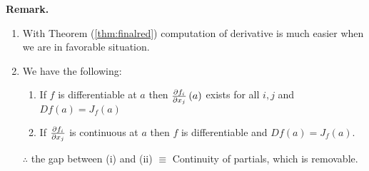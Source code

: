 \documentclass[Analysis-3]{subfiles}
\begin{document}
\textbf{Remark.}
\begin{enumerate}
  \item With Theorem (\ref{thm:finalred}) computation of derivative is much easier when we are in favorable situation.
  \item We have the following: \begin{enumerate}[label = (\roman*)]
          \item If $ f $ is differentiable at $ a $ then $ \pdv{f_i}{x_j}\left( a \right) $ exists for all $ i, j $ and $ Df(a) = J_{f}(a) $
          \item If $ \pdv{f_i}{x_j} $ is continuous at $ a $ then $ f $ is differentiable and $ Df(a) = J_{f}(a) $.
        \end{enumerate}
        $ \therefore $ the gap between (i) and (ii) $ \equiv $ Continuity of partials, which is removable.
\end{enumerate}
\end{document}
